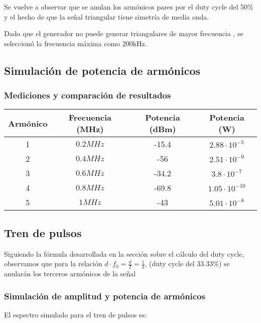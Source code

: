 \documentclass[../../labo_tp5_main.tex]{subfiles}
\begin{document}
Se vuelve a observar que se anulan los armónicos pares por el duty cycle del 50\% y el hecho de que la señal triangular tiene simetría de media onda.\par
Dado que el generador no puede generar triangulares de mayor frecuencia , se seleccionó la frecuencia máxima como 200kHz.\par

\subsection{Simulación de potencia de armónicos}


\subsubsection{Mediciones y comparación de resultados}
\begin{table}[H] %
	\centering
 		\begin{tabular}{||c c c c||} 
 			\hline
			Armónico & Frecuencia (MHz) & Potencia (dBm) & Potencia (W)\\ [0.5ex] 
 			\hline\hline
			1 & $0.2MHz$ & -15.4 & $2.88\cdot 10^{-5}$\\
			2 & $0.4MHz$ & -56 & $2.51\cdot 10^{-9}$\\
			3 & $0.6MHz$ & -34.2 & $3.8\cdot 10^{-7}$\\
			4 & $0.8MHz$ & -69.8 & $1.05\cdot 10^{-10}$\\
			5 & $1MHz$ & -43 & $5.01\cdot 10^{-8}$\\[1ex] 
			\hline
		\end{tabular}
\end{table}


\subsection{Tren de pulsos}

Siguiendo la fórmula desarrollada en la sección sobre el cálculo del duty cycle, observamos que para la relación $d \cdot f_0= \frac{d}{T}= \frac{1}{3} $, (duty cycle del 33.33\%) se anularán los terceros armónicos de la señal\par

\subsubsection{Simulación de amplitud y potencia de armónicos}
El espectro simulado para el tren de pulsos es:\par
%
\end{document}
